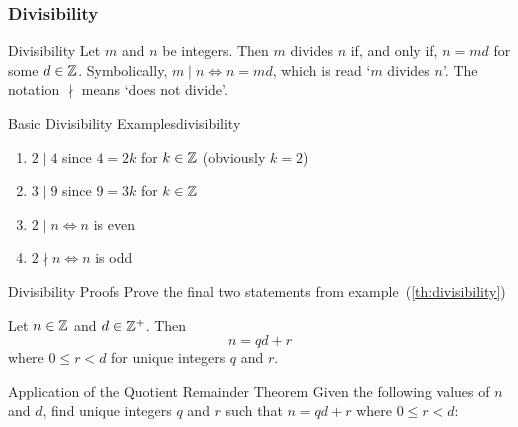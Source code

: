 \subsubsection{Divisibility}

\begin{definition}{Divisibility}{}
    Let $m$ and $n$ be integers. Then $m$ divides $n$ if, and only if, $n = md$ for some $d \in \mathbb Z$. Symbolically, $m \mid n \Leftrightarrow n = md$, which is read `$m$ divides $n$'. The notation $\nmid$ means `does not divide'.
\end{definition}

\begin{example}{Basic Divisibility Examples}{divisibility}
    \begin{enumerate}
        \item $2 \mid 4$ since $4 = 2k$ for $k \in \mathbb Z$ (obviously $k=2$)
        \item $3 \mid 9$ since $9 = 3k$ for $k \in \mathbb Z$
        \item $2 \mid n \Leftrightarrow n$ is even
        \item $2 \nmid n \Leftrightarrow n$ is odd
    \end{enumerate}
\end{example}

\begin{question}{Divisibility Proofs}{}
    Prove the final two statements from example~(\ref{th:divisibility})
\end{question}

\begin{tcolorbox}[colback=pink!70]
\begin{theorem}
    Let $n \in \mathbb Z$ and $d \in \mathbb Z^{+}$. Then 
    \begin{equation*}
        n = qd + r
    \end{equation*}
    where $0 \leq r < d$ for unique integers $q$ and $r$.
\end{theorem}
\end{tcolorbox}

\begin{question}{Application of the Quotient Remainder Theorem}{}
    Given the following values of $n$ and $d$, find unique integers $q$ and $r$ such that $n = qd + r$ where $0 \leq r < d$:
    \begin{questions}
    \end{questions}
\end{question}

